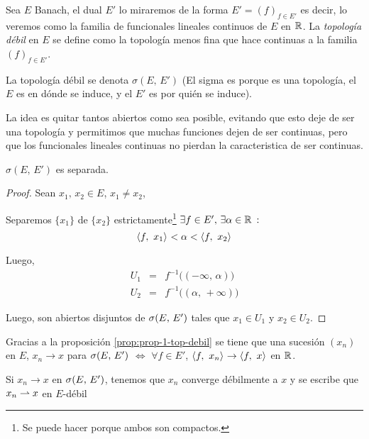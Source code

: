 \begin{defn}
Sea $E$ Banach, el dual $E'$ lo miraremos de la forma $E' = (f)_{f \in E'}$ es decir, lo veremos como la familia de funcionales lineales continuos de $E$ en $\rr$. La \textit{topología débil} en $E$ se define como la topología menos fina que hace continuas a la familia $(f)_{f \in E'}$.

La topología débil se denota $\sigma(E,\, E')$ (El sigma es porque es una topología, el $E$ es en dónde se induce, y el $E'$ es por quién se induce).
\end{defn}

La idea es quitar tantos abiertos como sea posible, evitando que esto deje de ser una topología y permitimos que muchas funciones dejen de ser continuas, pero que los funcionales lineales continuas no pierdan la caracteristica de ser continuas.

\begin{prop}[] \label{prop:prop-2-sig-E-E'-separada}
$\sigma(E,\, E')$ es separada.
\end{prop}

\begin{proof}
Sean $x_1,\, x_2 \in E$, $x_1 \not = x_2$,

Separemos $\{ x_1 \}$ de $\{ x_2 \}$ estrictamente\footnote{Se puede hacer porque ambos son compactos.} $\exists f \in E',\, \exists \alpha \in \rr \, : \, $ 
\begin{equation}
    \prodint[]{f}{x_1} < \alpha < \prodint[]{f}{x_2}
\end{equation}

Luego,
\begin{eqnarray}
    U_1 &=& f^{-1} \big( (-\infty,\, \alpha) \big) \\
    U_2 &=& f^{-1} \big( (\alpha,\, + \infty) \big)
\end{eqnarray}

Luego, son abiertos disjuntos de $\topdebilE$ tales que $x_1 \in U_1$ y $x_2 \in U_2$.
\end{proof}

Gracias a la proposición \ref{prop:prop-1-top-debil} se tiene que una sucesión $(x_n)$ en $E$, $x_n \to x$ para $\topdebilE$ $\iff$ $\forall f \in E'$, $\prodint[]{f}{x_n} \to \prodint[]{f}{x}$ en $\rr$.

\begin{notation}
Si $x_n \to x$ en $\topdebilE$, tenemos que $x_n$ converge débilmente a $x$ y se escribe que $x_n \convdebil x$ en $E$-débil
\end{notation}

